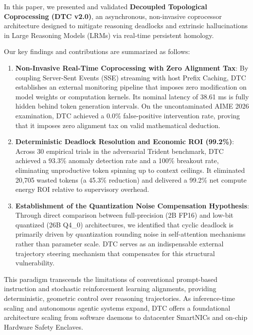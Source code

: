 \documentclass[11pt,a4paper]{article}
\begin{document}
In this paper, we presented and validated \textbf{Decoupled Topological Coprocessing (DTC v2.0)}, an asynchronous, non-invasive coprocessor architecture designed to mitigate reasoning deadlocks and extrinsic hallucinations in Large Reasoning Models (LRMs) via real-time persistent homology.

Our key findings and contributions are summarized as follows:
\begin{enumerate}
    \item \textbf{Non-Invasive Real-Time Coprocessing with Zero Alignment Tax}: By coupling Server-Sent Events (SSE) streaming with host Prefix Caching, DTC establishes an external monitoring pipeline that imposes zero modification on model weights or computation kernels. Its nominal latency of 38.61 ms is fully hidden behind token generation intervals. On the uncontaminated AIME 2026 examination, DTC achieved a 0.0\% false-positive intervention rate, proving that it imposes zero alignment tax on valid mathematical deduction.
    \item \textbf{Deterministic Deadlock Resolution and Economic ROI (99.2\%)}: Across 30 empirical trials in the adversarial Trident benchmark, DTC achieved a 93.3\% anomaly detection rate and a 100\% breakout rate, eliminating unproductive token spinning up to context ceilings. It eliminated 20,705 wasted tokens (a 45.3\% reduction) and delivered a 99.2\% net compute energy ROI relative to supervisory overhead.
    \item \textbf{Establishment of the Quantization Noise Compensation Hypothesis}: Through direct comparison between full-precision (2B FP16) and low-bit quantized (26B Q4\_0) architectures, we identified that cyclic deadlock is primarily driven by quantization rounding noise in self-attention mechanisms rather than parameter scale. DTC serves as an indispensable external trajectory steering mechanism that compensates for this structural vulnerability.
\end{enumerate}

This paradigm transcends the limitations of conventional prompt-based instruction and stochastic reinforcement learning alignments, providing deterministic, geometric control over reasoning trajectories. As inference-time scaling and autonomous agentic systems expand, DTC offers a foundational architecture scaling from software daemons to datacenter SmartNICs and on-chip Hardware Safety Enclaves.
\end{document}
